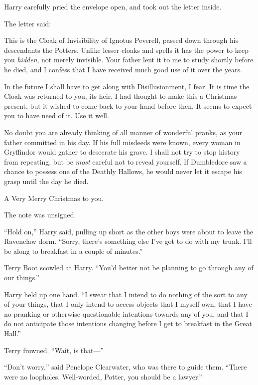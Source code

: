 Harry carefully pried the envelope open, and took out the letter inside.

The letter said:

\begin{writtenNote}
This is the Cloak of Invisibility of Ignotus Peverell, passed down through his descendants the Potters. Unlike lesser cloaks and spells it has the power to keep you \emph{hidden}, not merely invisible. Your father lent it to me to study shortly before he died, and I confess that I have received much good use of it over the years.

In the future I shall have to get along with Disillusionment, I fear. It is time the Cloak was returned to you, its heir. I had thought to make this a Christmas present, but it wished to come back to your hand before then. It seems to expect you to have need of it. Use it well.

No doubt you are already thinking of all manner of wonderful pranks, as your father committed in his day. If his full misdeeds were known, every woman in Gryffindor would gather to desecrate his grave. I shall not try to stop history from repeating, but be \emph{most} careful not to reveal yourself. If Dumbledore saw a chance to possess one of the Deathly Hallows, he would never let it escape his grasp until the day he died.

A Very Merry Christmas to you.
\end{writtenNote}

The note was unsigned.

\later

“Hold on,” Harry said, pulling up short as the other boys were about to leave the Ravenclaw dorm. “Sorry, there’s something else I’ve got to do with my trunk. I’ll be along to breakfast in a couple of minutes.”

Terry Boot scowled at Harry. “You’d better not be planning to go through any of our things.”

Harry held up one hand. “I swear that I intend to do nothing of the sort to any of your things, that I only intend to access objects that I myself own, that I have no pranking or otherwise questionable intentions towards any of you, and that I do not anticipate those intentions changing before I get to breakfast in the Great Hall.”

Terry frowned. “Wait, is that—”

“Don’t worry,” said Penelope Clearwater, who was there to guide them. “There were no loopholes. Well-worded, Potter, you should be a lawyer.”

